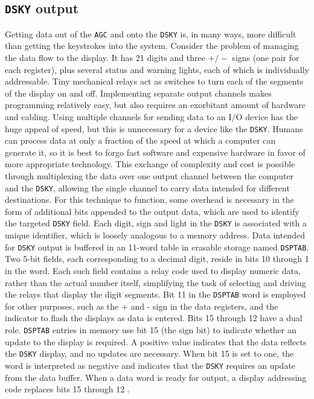 \documentclass[refcap, oxford]{ahsan}
\begin{document}
\subsection{\texttt{DSKY} output}
Getting data out of the \texttt{AGC} and onto the \texttt{DSKY} is, in many ways, more difficult than getting the keystrokes into the system. Consider the problem of managing the data flow to the display. It has 21 digits and three $+/-$ signs (one pair for each register), plus several status and warning lights, each of which is individually addressable. Tiny mechanical relays act as switches to turn each of the segments of the display on and off. Implementing separate output channels makes programming relatively easy, but also requires an exorbitant amount of hardware and cabling. Using multiple channels for sending data to an I/O device has the huge appeal of speed, but this is unnecessary for a device like the \texttt{DSKY}. Humans can process data at only a fraction of the speed at which a computer can generate it, so it is best to forgo fast software and expensive hardware in favor of more appropriate technology. This exchange of complexity and cost is possible through multiplexing the data over one output channel between the computer and the \texttt{DSKY}, allowing the single channel to carry data intended for different destinations. For this technique to function, some overhead is necessary in the form of additional bits appended to the output data, which are used to identify the targeted \texttt{DSKY} field. Each digit, sign and light in the \texttt{DSKY} is associated with a unique identifier, which is loosely analogous to a memory address. Data intended for \texttt{DSKY} output is buffered in an 11-word table in erasable storage named \texttt{DSPTAB}. Two 5-bit fields, each corresponding to a decimal digit, reside in bits 10 through 1 in the word. Each such field contains a relay code used to display numeric data, rather than the actual number itself, simplifying the task of selecting and driving the relays that display the digit segments. Bit 11 in the \texttt{DSPTAB} word is employed for other purposes, such as the + and - sign in the data registers, and the indicator to flash the displays as data is entered. Bits 15 through 12 have a dual role. \texttt{DSPTAB} entries in memory use bit 15 (the sign bit) to indicate whether an update to the display is required. A positive value indicates that the data reflects the \texttt{DSKY} display, and no updates are necessary. When bit 15 is set to one, the word is interpreted as negative and indicates that the \texttt{DSKY} requires an update from the data buffer. When a data word is ready for output, a display addressing code replaces bits 15 through 12 .
\end{document}
